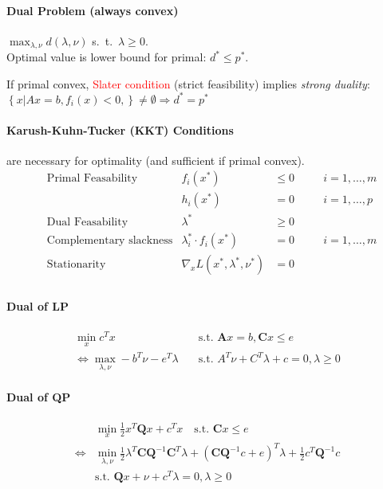 \documentclass[landscape,a4paper,8pt]{scrartcl}
\newcommand{\remph}[1]{{\textcolor{red}{#1}}}
\newcommand\vA{\bm{A}}
\newcommand\vC{\bm{C}}
\newcommand\vQ{\bm{Q}}
\begin{document}
\begin{multicols*}{3}
\paragraph{Dual Problem (always convex)} 
$\max_{\lambda,\nu} d(\lambda,\nu)$ s.\ t.\ $\lambda \geq 0$. \\
Optimal value is lower bound for primal: $d^* \leq p^*$.

If primal convex, \remph{Slater condition} (strict feasibility) implies \emph{strong duality}:
$\left\{x \left| \right. Ax=b, f_i(x)<0, \right\} \neq \emptyset \Rightarrow d^*  = p^* $
%
\paragraph{Karush-Kuhn-Tucker (KKT) Conditions}
are necessary for optimality (and sufficient if primal convex).
\begin{align*}
& \text{Primal Feasability} & f_i(x^*)  &\leq 0 \quad && i=1,\dots,m \\
&                           & h_i(x^*)  &=0 \quad && i=1,\dots,p \\
& \text{Dual Feasability}        & \lambda^* & \geq 0 && \\
& \text{Complementary slackness} & \lambda_i^* \cdot f_i(x^*) & = 0 && i = 1,\dots,m \\
& \text{Stationarity} & \nabla_x L(x^*,\lambda^*,\nu^*) & = 0 && \\
\end{align*}
%
\paragraph{Dual of LP}
\begin{align*}
     \min_x c^T x & \quad \text{s.t.\ } \vA x = b, \vC x \leq e \\
\iff \max_{\lambda,\nu} -b^T\nu - e^T\lambda & \quad \text{s.t.\ } A^T\nu + C^T\lambda + c = 0, \lambda \geq 0
\end{align*}

\paragraph{Dual of QP}
\begin{align*}
     & \min_x \frac{1}{2}x^T\vQ x + c^T x \quad \text{s.t.\ } \vC x \leq e \\
\iff & \min_{\lambda,\nu} \frac{1}{2}\lambda^T\vC\vQ^{-1}\vC^T\lambda + (\vC\vQ^{-1}c + e)^T\lambda + \frac{1}{2} c^T \vQ^{-1}c \\
     & \text{s.t.\ } \vQ x + \nu + c^T \lambda = 0, \lambda \geq 0
\end{align*}


\end{multicols*}
\end{document}
